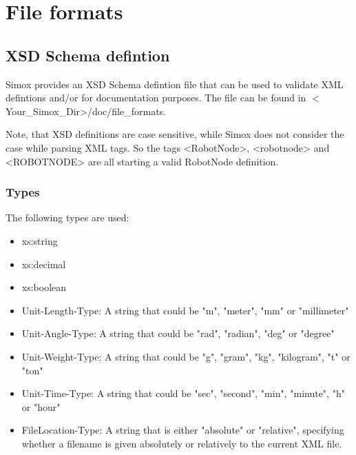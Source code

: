 \documentclass{book}
\begin{document}
\section{File formats}
\subsection{XSD Schema defintion}
Simox provides an XSD Schema defintion file that can be used to validate XML defintions and/or for documentation purposes. The file can be found in $<$Your\_Simox\_Dir>/doc/file\_formats.
\par
Note, that XSD definitions are case sensitive, while Simox does not consider the case while parsing XML tags. So the tags <RobotNode>, <robotnode> and <ROBOTNODE> are all starting a valid RobotNode definition. 
\subsubsection{Types}
The following types are used: 
\begin{itemize}
\item xs:string 
\item xs:decimal
\item xs:boolean 
\item Unit-Length-Type: A string that could be "m", "meter", "mm" or "millimeter"
\item Unit-Angle-Type: A string that could be "rad", "radian", "deg" or "degree"
\item Unit-Weight-Type: A string that could be "g", "gram", "kg", "kilogram", "t" or "ton"
\item Unit-Time-Type: A string that could be "sec", "second", "min", "minute", "h" or "hour"
\item FileLocation-Type: A string that is either "absolute" or "relative", specifying whether a filename is given absolutely or relatively to the current XML file. 
\end{itemize}
\end{document}
